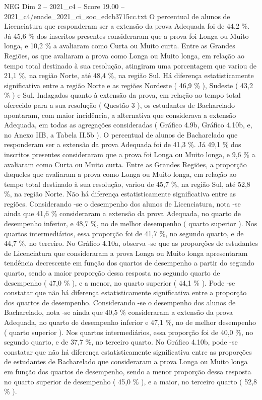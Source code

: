 \begin{textsample}{NEG Dim 2 – 2021\_c4 – Score 19.00 – 2021\_c4/enade\_2021\_ci\_soc\_edcb3715cc.txt}
O percentual de alunos de Licenciatura que responderam ser a extensão da prova Adequada foi de 44,2 \%.
Já 45,6 \% dos inscritos presentes consideraram que a prova foi Longa ou Muito longa, e 10,2 \% a avaliaram como Curta ou Muito curta.
Entre as Grandes Regiões, os que avaliaram a prova como Longa ou Muito longa, em relação ao tempo total destinado à sua resolução, atingiram uma porcentagem que variou de 21,1 \%, na região Norte, até 48,4 \%, na região Sul.
Há diferença estatisticamente significativa entre a região Norte e as regiões Nordeste ( 46,9 \% ), Sudeste ( 43,2 \% ) e Sul.
Indagados quanto à extensão da prova, em relação ao tempo total oferecido para a sua resolução ( Questão 3 ), os estudantes de Bacharelado apontaram, com maior incidência, a alternativa que considerava a extensão Adequada, em todas as agregações consideradas ( Gráfico 4.9b, Gráfico 4.10b, e, no Anexo IIB, a Tabela II.5b ).
O percentual de alunos de Bacharelado que responderam ser a extensão da prova Adequada foi de 41,3 \%.
Já 49,1 \% dos inscritos presentes consideraram que a prova foi Longa ou Muito longa, e 9,6 \% a avaliaram como Curta ou Muito curta.
Entre as Grandes Regiões, a proporção daqueles que avaliaram a prova como Longa ou Muito longa, em relação ao tempo total destinado à sua resolução, variou de 45,7 \%, na região Sul, até 52,8 \%, na região Norte.
Não há diferença estatisticamente significativa entre as regiões.
Considerando -se o desempenho dos alunos de Licenciatura, nota -se ainda que 41,6 \% consideraram a extensão da prova Adequada, no quarto de desempenho inferior, e 48,7 \%, no de melhor desempenho ( quarto superior ).
Nos quartos intermediários, essa proporção foi de 41,7 \%, no segundo quarto, e de 44,7 \%, no terceiro.
No Gráfico 4.10a, observa -se que as proporções de estudantes de Licenciatura que consideraram a prova Longa ou Muito longa apresentaram tendência decrescente em função dos quartos de desempenho a partir do segundo quarto, sendo a maior proporção dessa resposta no segundo quarto de desempenho ( 47,0 \% ), e a menor, no quarto superior ( 44,1 \% ).
Pode -se constatar que não há diferença estatisticamente significativa entre a proporção dos quartos de desempenho.
Considerando -se o desempenho dos alunos de Bacharelado, nota -se ainda que 40,5 \% consideraram a extensão da prova Adequada, no quarto de desempenho inferior e 47,1 \%, no de melhor desempenho ( quarto superior ).
Nos quartos intermediários, essa proporção foi de 40,0 \%, no segundo quarto, e de 37,7 \%, no terceiro quarto.
No Gráfico 4.10b, pode -se constatar que não há diferença estatisticamente significativa entre as proporções de estudantes de Bacharelado que consideraram a prova Longa ou Muito longa em função dos quartos de desempenho, sendo a menor proporção dessa resposta no quarto superior de desempenho ( 45,0 \% ), e a maior, no terceiro quarto ( 52,8 \% ).

\end{textsample}
